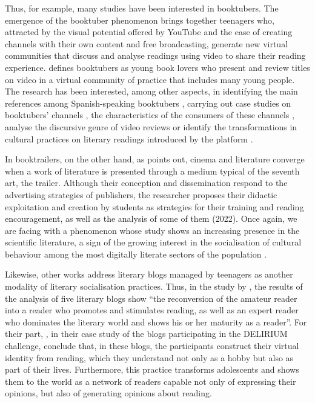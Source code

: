 \documentclass[english]{textolivre}
\begin{document}
Thus, for example, many studies have been interested in booktubers. The emergence of the booktuber phenomenon brings together teenagers who, attracted by the visual potential offered by YouTube and the ease of creating channels with their own content and free broadcasting, generate new virtual communities that discuss and analyse readings using video to share their reading experience. \textcite{ravettino_destefanis_booktubers_2015} defines booktubers as young book lovers who present and review titles on video in a virtual community of practice that includes many young people. The research has been interested, among other aspects, in identifying the main references among Spanish-speaking booktubers \cite{hernandez_ortega_nuevos_2021}, carrying out case studies on booktubers’ channels \cite{vizcaino-verdu_reading_2019, lopez-gil_promocion_2021}, the characteristics of the consumers of these channels \cite{noguera_habitos_2020}, analyse the discursive genre of video reviews \cite{paladines-paredes_videoresenas_2021a} or identify the transformations in cultural practices on literary readings introduced by the platform \cite{paladines-paredes_canales_2020}.

In booktrailers, on the other hand, as \textcite{rovira-collado_booktrailer_2017} points out, cinema and literature converge when a work of literature is presented through a medium typical of the seventh art, the trailer. Although their conception and dissemination respond to the advertising strategies of publishers, the researcher proposes their didactic exploitation and creation by students as strategies for their training and reading encouragement, as well as the analysis of some of them (2022). Once again, we are facing with a phenomenon whose study shows an increasing presence in the scientific literature, a sign of the growing interest in the socialisation of cultural behaviour among the most digitally literate sectors of the population \cite{cordon_garcia_socializacion_2023}.

Likewise, other works address literary blogs managed by teenagers as another modality of literary socialisation practices. Thus, in the study by \textcite[p.68]{manresa_practicas_2016}, the results of the analysis of five literary blogs show “the reconversion of the amateur reader into a reader who promotes and stimulates reading, as well as an expert reader who dominates the literary world and shows his or her maturity as a reader”. For their part, \textcite{sanchezgarcia_lectura_2013}, in their case study of the blogs participating in the DELIRIUM challenge, conclude that, in these blogs, the participants construct their virtual identity from reading, which they understand not only as a hobby but also as part of their lives. Furthermore, this practice transforms adolescents and shows them to the world as a network of readers capable not only of expressing their opinions, but also of generating opinions about reading.
\end{document}
